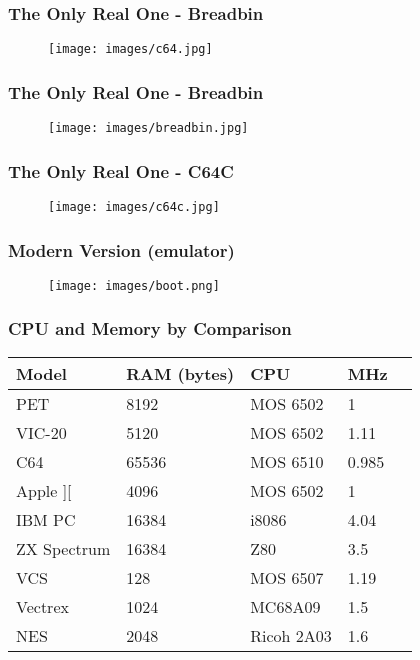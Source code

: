 \documentclass[aspectratio=43]{uva-inf-presentation}
\begin{document}

\begin{frame}
\frametitle{The Only Real One - Breadbin}

\begin{figure}
\texttt{[image: images/c64.jpg]}
\end{figure}

\end{frame}


\begin{frame}
\frametitle{The Only Real One - Breadbin}

\begin{figure}
\texttt{[image: images/breadbin.jpg]}
\end{figure}

\end{frame}


\begin{frame}
\frametitle{The Only Real One - C64C}

\begin{figure}
\texttt{[image: images/c64c.jpg]}
\end{figure}

\end{frame}


\begin{frame}
\frametitle{Modern Version (emulator)}

\begin{figure}
\texttt{[image: images/boot.png]}
\end{figure}

\end{frame}


\begin{frame}
\frametitle{CPU and Memory by Comparison}

\begin{tabular}{|l|l|l|l|l|}
\hline Model & RAM (bytes) & CPU & MHz \\ \hline
PET & 8192 & MOS 6502 & 1 \\
VIC-20 & 5120 & MOS 6502 & 1.11 \\
C64 & 65536 & MOS 6510 & 0.985 \\ \hline
Apple ][ & 4096 & MOS 6502 & 1 \\
IBM PC & 16384 & i8086 & 4.04 \\
ZX Spectrum & 16384 & Z80 & 3.5 \\ \hline
VCS & 128 & MOS 6507 & 1.19 \\
Vectrex & 1024 & MC68A09 & 1.5 \\
NES & 2048 & Ricoh 2A03 & 1.6 \\ \hline
\end{tabular}

\end{frame}
\end{document}
